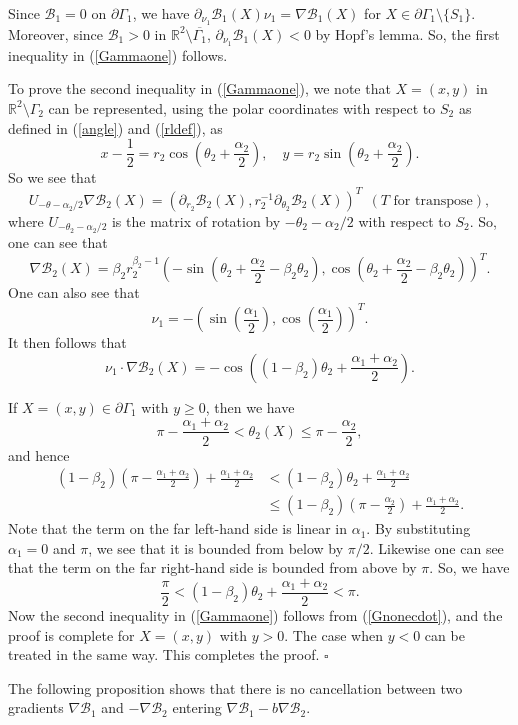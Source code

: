 \documentclass[11pt,a4paper]{article}
\numberwithin{equation}{section}
\newcommand{\qed}{\hfill \ensuremath{\square}}
\newcommand{\p}{\partial}
\newcommand{\eqnref}[1]{(\ref {#1})}
\newcommand{\Rbb}{\mathbb{R}}
\newcommand{\Bcal}{\mathcal{B}}
\newcommand{\Ga}{\alpha}
\newcommand{\Gb}{\beta}
\newcommand{\Gt}{\theta}
\newcommand{\GG}{\Gamma}
\newcommand{\beq}{\begin{equation}}
\newcommand{\eeq}{\end{equation}}
\begin{document}
Since $\Bcal_1=0$ on $\p\GG_1$, we have $\p_{\nu_1} \Bcal_1(X) \nu_1 = \nabla \Bcal_1(X)$ for $X \in \p\GG_1 \setminus \{ S_1 \}$. Moreover, since $\Bcal_1 >0 $ in $\Rbb^2 \setminus \overline{\GG_1}$, $\p_{\nu_1} \Bcal_1(X) <0$ by Hopf's lemma. So, the first inequality in \eqnref{Gammaone} follows.

To prove the second inequality in \eqnref{Gammaone}, we note that $X=(x, y)$ in $\Rbb^2 \setminus \GG_2$ can be represented, using the polar coordinates with respect to $S_2$ as defined in \eqnref{angle} and \eqnref{rldef}, as
$$
x-\frac 1 2 =r_2 \cos \left( \Gt_2 + \frac{\Ga_2}{2} \right), \quad y=r_2 \sin \left( \Gt_2 + \frac{\Ga_2}{2} \right).
$$
So we see that
$$
U_{-\Gt-\Ga_2/2} \nabla \Bcal_2(X)= (\p_{r_2} \Bcal_2(X), r_2^{-1} \p_{\Gt_2} \Bcal_2(X))^T \ \ (T \mbox{ for transpose}),
$$
where $U_{-\Gt_2-\Ga_2/2}$ is the matrix of rotation by $-\Gt_2-\Ga_2/2$ with respect to $S_2$. So, one can see that
\beq\label{nabcal2}
\nabla \Bcal_2(X) = \Gb_2 r_2^{\Gb_2-1} \left( -\sin \left( \Gt_2+ \frac{\Ga_2}{2} - \Gb_2 \Gt_2 \right), \cos \left( \Gt_2+ \frac{\Ga_2}{2} - \Gb_2 \Gt_2 \right) \right)^T.
\eeq
One can also see that
$$
\nu_1= -\left( \sin \left( \frac{\Ga_1}{2} \right), \cos \left( \frac{\Ga_1}{2} \right) \right)^T.
$$
It then follows that
\beq\label{Gnonecdot}
\nu_1 \cdot \nabla \Bcal_2(X)= - \cos \left( (1-\Gb_2)\Gt_2 + \frac{\Ga_1+\Ga_2}{2} \right).
\eeq


If $X =(x,y) \in \p\GG_1$ with $y \ge 0$, then we have
$$
\pi - \frac{\Ga_1+\Ga_2}{2} < \Gt_2(X) \le \pi - \frac{\Ga_2}{2},
$$
and hence
\begin{align*}
(1-\Gb_2) \left( \pi - \frac{\Ga_1+\Ga_2}{2} \right) + \frac{\Ga_1+\Ga_2}{2} &< (1-\Gb_2)\Gt_2 + \frac{\Ga_1+\Ga_2}{2} \\
&\le (1-\Gb_2) \left( \pi - \frac{\Ga_2}{2} \right) + \frac{\Ga_1+\Ga_2}{2}.
\end{align*}
Note that the term on the far left-hand side is linear in $\Ga_1$. By substituting $\Ga_1=0$ and $\pi$, we see that it is bounded from below by $\pi/2$. Likewise one can see that the term on the far right-hand side is bounded from above by $\pi$. So, we have
$$
\frac{\pi}{2} < (1-\Gb_2)\Gt_2 + \frac{\Ga_1+\Ga_2}{2} < \pi.
$$
Now the second inequality in \eqnref{Gammaone} follows from \eqnref{Gnonecdot}, and the proof is complete for $X=(x,y)$ with $y > 0$. The case when $y<0$ can be treated in the same way. This completes the proof. \qed

The following proposition shows that there is no cancellation between two gradients $\nabla\Bcal_1$ and $-\nabla\Bcal_2$ entering $\nabla \Bcal_1 - b \nabla \Bcal_2$.
\end{document}
